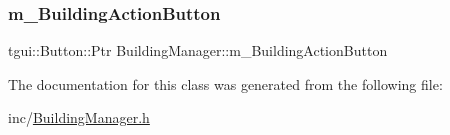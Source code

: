 \subsubsection{\texorpdfstring{m\+\_\+\+Building\+Action\+Button}{m\_BuildingActionButton}}
{\footnotesize\ttfamily tgui\+::\+Button\+::\+Ptr Building\+Manager\+::m\+\_\+\+Building\+Action\+Button}



The documentation for this class was generated from the following file\+:\begin{DoxyCompactItemize}
\item 
inc/\mbox{\hyperlink{_building_manager_8h}{Building\+Manager.\+h}}\end{DoxyCompactItemize}
